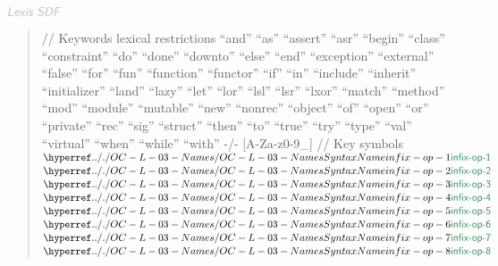 $\KEY{Lexis SDF}$

\begin{quote}
// Keywords\newline
\newline
lexical restrictions\newline
\newline
      {}``and{}''          {}``as{}''         {}``assert{}''   {}``asr{}''       {}``begin{}''     {}``class{}''\newline
      {}``constraint{}''   {}``do{}''         {}``done{}''     {}``downto{}''    {}``else{}''      {}``end{}''\newline
      {}``exception{}''    {}``external{}''   {}``false{}''    {}``for{}''       {}``fun{}''       {}``function{}''\newline
      {}``functor{}''      {}``if{}''         {}``in{}''       {}``include{}''   {}``inherit{}''   {}``initializer{}''\newline
      {}``land{}''         {}``lazy{}''       {}``let{}''      {}``lor{}''       {}``lsl{}''       {}``lsr{}''\newline
      {}``lxor{}''         {}``match{}''      {}``method{}''   {}``mod{}''       {}``module{}''    {}``mutable{}'' \newline
      {}``new{}''          {}``nonrec{}''     {}``object{}''   {}``of{}''        {}``open{}''      {}``or{}''     \newline
      {}``private{}''      {}``rec{}''        {}``sig{}''      {}``struct{}''    {}``then{}''      {}``to{}''\newline
      {}``true{}''         {}``try{}''        {}``type{}''     {}``val{}''       {}``virtual{}''   {}``when{}'' \newline
      {}``while{}''        {}``with{}''\newline
  -/- {[}A-Za-z0-9\_{]} \newline
\newline
// Key symbols\newline
\newline
$\SHADE{\SYNHYPER{../.}{OC-L-03-Names}{infix-op-1}}$ $\SHADE{\SYNHYPER{../.}{OC-L-03-Names}{infix-op-2}}$ $\SHADE{\SYNHYPER{../.}{OC-L-03-Names}{infix-op-3}}$ $\SHADE{\SYNHYPER{../.}{OC-L-03-Names}{infix-op-4}}$ \newline
$\SHADE{\SYNHYPER{../.}{OC-L-03-Names}{infix-op-5}}$ $\SHADE{\SYNHYPER{../.}{OC-L-03-Names}{infix-op-6}}$ $\SHADE{\SYNHYPER{../.}{OC-L-03-Names}{infix-op-7}}$ $\SHADE{\SYNHYPER{../.}{OC-L-03-Names}{infix-op-8}}$ \newline

\end{quote}

